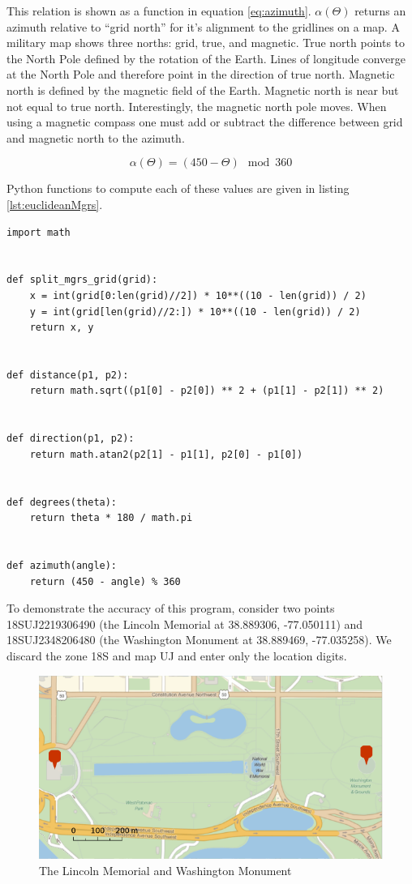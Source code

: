 \documentclass{book}
\begin{document}
This relation is shown as a function in equation \ref{eq:azimuth}. $\alpha(\Theta)$  returns an azimuth relative to ``grid north'' for it's alignment to the gridlines on a map. A military map shows three norths: grid, true, and magnetic. True north points to the North Pole defined by the rotation of the Earth. Lines of longitude converge at the North Pole and therefore point in the direction of true north. Magnetic north is defined by the magnetic field of the Earth. Magnetic north is near but not equal to true north. Interestingly, the magnetic north pole moves. When using a magnetic compass one must add or subtract the difference between grid and magnetic north to the azimuth.

\begin{equation}
  \label{eq:azimuth}
  \alpha(\Theta) = (450 - \Theta) \mod{360}
\end{equation}

Python functions to compute each of these values are given in listing \ref{lst:euclideanMgrs}.

\begin{lstlisting}[float,caption={Euclidean distance and direction functions in Python},captionpos=b,label={lst:euclideanMgrs}]
import math


def split_mgrs_grid(grid):
	x = int(grid[0:len(grid)//2]) * 10**((10 - len(grid)) / 2)
	y = int(grid[len(grid)//2:]) * 10**((10 - len(grid)) / 2)
	return x, y


def distance(p1, p2):
	return math.sqrt((p1[0] - p2[0]) ** 2 + (p1[1] - p2[1]) ** 2)


def direction(p1, p2):
	return math.atan2(p2[1] - p1[1], p2[0] - p1[0])


def degrees(theta):
	return theta * 180 / math.pi


def azimuth(angle):
	return (450 - angle) % 360
\end{lstlisting}

To demonstrate the accuracy of this program, consider two points 18SUJ2219306490 (the Lincoln Memorial at 38.889306, -77.050111) and 18SUJ2348206480 (the Washington Monument at 38.889469, -77.035258). We discard the zone 18S and map UJ and enter only the location digits.

\begin{figure}[h]
\centering
\includegraphics[width=.75\textwidth,keepaspectratio]{figures/washington-lincoln}
\caption{The Lincoln Memorial and Washington Monument}
\end{figure}
\end{document}
